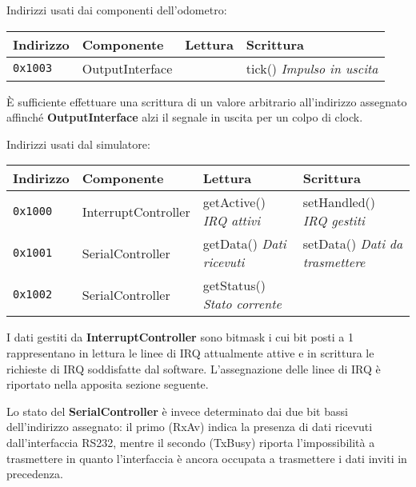 \documentclass [11pt,a4paper,oneside]{paper}
\newcommand{\component}[1]{\textbf{#1}}
\begin{document}
Indirizzi usati dai componenti dell'odometro:
\vspace{0.5em}

\begin{tabular}{|l|l|l|l|}
\hline
Indirizzo & Componente & Lettura & Scrittura \\
\hline
\texttt{0x1003} & OutputInterface & & tick() \textit{Impulso in uscita} \\
\hline
\end{tabular}
\vspace{1em}

È sufficiente effettuare una scrittura di un valore arbitrario
all'indirizzo assegnato affinché \component{OutputInterface}
alzi il segnale in uscita per un colpo di clock.

\vspace{1em}
Indirizzi usati dal simulatore:
\vspace{0.5em}

\begin{tabular}{|l|l|l|l|}
\hline
Indirizzo & Componente & Lettura & Scrittura \\
\hline
\texttt{0x1000} & InterruptController & getActive() \textit{IRQ attivi}
                                      & setHandled() \textit{IRQ gestiti} \\
\hline
\texttt{0x1001} & SerialController & getData() \textit{Dati ricevuti}
                                   & setData() \textit{Dati da trasmettere} \\
\hline
\texttt{0x1002} & SerialController & getStatus() \textit{Stato corrente} & \\
\hline
\end{tabular}

\vspace{1em}

I dati gestiti da \component{InterruptController} sono bitmask i cui bit
posti a 1 rappresentano in lettura le linee di IRQ attualmente attive e
in scrittura le richieste di IRQ soddisfatte dal software. L'assegnazione
delle linee di IRQ è riportato nella apposita sezione seguente.

Lo stato del \component{SerialController} è invece determinato dai due bit
bassi dell'indirizzo assegnato: il primo (RxAv) indica la presenza di dati
ricevuti dall'interfaccia RS232, mentre il secondo (TxBusy) riporta
l'impossibilità a trasmettere in quanto l'interfaccia è ancora occupata a
trasmettere i dati inviti in precedenza.

\vspace{1em}
\end{document}
